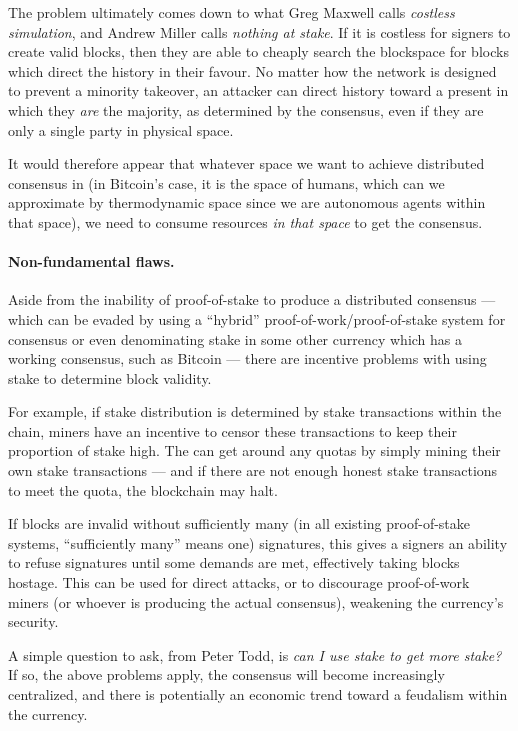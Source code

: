 \documentclass[letterpaper]{article}
\begin{document}
The problem ultimately comes down to what Greg Maxwell calls \emph{costless
simulation}, and Andrew Miller calls \emph{nothing at stake}. If it is costless
for signers to create valid blocks, then they are able to cheaply search the
blockspace for blocks which direct the history in their favour. No matter how
the network is designed to prevent a minority takeover, an attacker can direct
history toward a present in which they \emph{are} the majority, as determined
by the consensus, even if they are only a single party in physical space.

It would therefore appear that whatever space we want to achieve distributed
consensus in (in Bitcoin's case, it is the space of humans, which can we approximate
by thermodynamic space since we are autonomous agents within that space), we
need to consume resources \emph{in that space} to get the consensus.

\paragraph{Non-fundamental flaws.} Aside from the inability of proof-of-stake
to produce a distributed consensus --- which can be evaded by using a ``hybrid''
proof-of-work/proof-of-stake system for consensus or even denominating stake
in some other currency which has a working consensus, such as Bitcoin --- there
are incentive problems with using stake to determine block validity.

For example, if stake distribution is determined by stake transactions within
the chain, miners have an incentive to censor these transactions to keep their
proportion of stake high. The can get around any quotas by simply mining their
own stake transactions --- and if there are not enough honest stake transactions
to meet the quota, the blockchain may halt.

If blocks are invalid without sufficiently many (in all existing proof-of-stake
systems, ``sufficiently many'' means one) signatures, this gives a signers an
ability to refuse signatures until some demands are met, effectively taking
blocks hostage. This can be used for direct attacks, or to discourage proof-of-work
miners (or whoever is producing the actual consensus), weakening the currency's
security.

A simple question to ask, from Peter Todd, is \emph{can I use stake to get more
stake?} If so, the above problems apply, the consensus will become increasingly
centralized, and there is potentially an economic trend toward a feudalism
within the currency.
\end{document}
